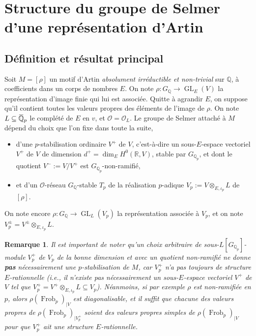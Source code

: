 \documentclass[12pt]{amsart}
\newcommand\bR{\mathbb{R}}
\newcommand\bQ{\mathbb{Q}}
\newcommand\Qp{\mathbb{Q}_{p}}
\newcommand\cO{\mathcal{O}}
\newcommand{\ob}[1]{\mkern 1.5mu\overline{\mkern-1.5mu#1\mkern-1.5mu}\mkern 1.5mu}
\DeclareMathOperator{\Frob}{Frob}
\DeclareMathOperator{\GL}{GL}
\theoremstyle{defstyle}
\newtheorem{remarque}[subsubsection]{Remarque}
\theoremstyle{thmstyle}
\begin{document}
	\section{Structure du groupe de Selmer d'une représentation d'Artin}
\label{section4}
\subsection{Définition et résultat principal} \label{sec:différente_inverse}
Soit $M=[\rho]$ un motif d'Artin \textit{absolument irréductible et non-trivial} sur $\bQ$, à coefficients dans un corps de nombres $E$. On note $\rho : G_\bQ \longrightarrow \GL_E(V)$ la représentation d'image finie qui lui est associée. Quitte à agrandir $E$, on suppose qu'il contient toutes les valeurs propres des éléments de l'image de $\rho$. On note $L \subseteq \ob{\bQ}_p$ le complété de $E$ en $v$, et $\cO=\cO_L$. Le groupe de Selmer attaché à $M$ dépend du choix que l'on fixe dans toute la suite, 
\begin{itemize}
	\item d'une $p$-stabilisation ordinaire $V^+$ de $V$, c'est-à-dire un sous-$E$-espace vectoriel $V^+$ de $V$ de dimension $d^+=\dim_E H^0(\bR,V)$, stable par $G_{\Qp}$, et dont le quotient $V^-:=V/V^+$ est $G_{\Qp}$-non-ramifié,
	\item et d'un $\cO$-réseau $G_{\bQ}$-stable $T_p$ de la réalisation $p$-adique $V_p:=V \otimes_{E,\iota_p} L$ de $[\rho]$.  
\end{itemize}

On note encore $\rho : G_\bQ \longrightarrow \GL_L(V_p)$ la représentation associée à $V_p$, et on note $V_p^\pm= V^\pm \otimes_{E,\iota_p} L$.

\begin{remarque}\label{rem:choix_structure_rationnelle}
	Il est important de noter qu'un choix arbitraire de sous-$L[G_{\Qp}]$-module $V_p^+$ de $V_p$ de la bonne dimension et avec un quotient non-ramifié ne donne \textbf{pas} nécessairement une $p$-stabilisation de $M$, car $V_p^+$ n'a pas toujours de structure $E$-rationnelle (\textit{i.e.}, il n'existe pas nécessairement un sous-$E$-espace vectoriel $V^+$ de $V$ tel que $V_p^+=V^+ \otimes_{E,\iota_p} L \subseteq V_p$). Néanmoins, si par exemple $\rho$ est non-ramifiée en $p$, alors $\rho(\Frob_p)_{|V}$ est diagonalisable, et il suffit que chacune des valeurs propres de $\rho(\Frob_p)_{|V_p^+}$ soient des valeurs propres simples de $\rho(\Frob_p)_{|V}$ pour que $V_p^+$ ait une structure $E$-rationnelle.  
\end{remarque}
\end{document}
